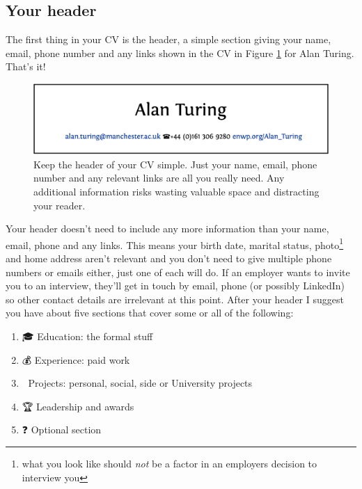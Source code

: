 \documentclass[
]{book}
\providecommand{\tightlist}{%
  \setlength{\itemsep}{0pt}\setlength{\parskip}{0pt}}
\begin{document}
\hypertarget{mycvpd}{%
\subsection{Your header}\label{mycvpd}}

The first thing in your CV is the header, a simple section giving your name, email, phone number and any links shown in the CV in Figure \ref{fig:turinghead-fig} for Alan Turing. That's it!

\begin{figure}

{\centering \includegraphics[width=0.98\linewidth]{images/alan-turing-header} 

}

\caption{Keep the header of your CV simple. Just your name, email, phone number and any relevant links are all you really need. Any additional information risks wasting valuable space and distracting your reader.}\label{fig:turinghead-fig}
\end{figure}



Your header doesn't need to include any more information than your name, email, phone and any links. This means your birth date, marital status, photo\footnote{what you look like should \emph{not} be a factor in an employers decision to interview you} and home address aren't relevant and you don't need to give multiple phone numbers or emails either, just one of each will do. If an employer wants to invite you to an interview, they'll get in touch by email, phone (or possibly LinkedIn) so other contact details are irrelevant at this point. After your header I suggest you have about five sections that cover some or all of the following:

\begin{enumerate}
\def\labelenumi{\arabic{enumi}.}
\tightlist
\item
  🎓 Education: the formal stuff
\item
  💰 Experience: paid work
\item
  💪 Projects: personal, social, side or University projects
\item
  🏆 Leadership and awards
\item
  ❓ Optional section
\end{enumerate}
\end{document}
